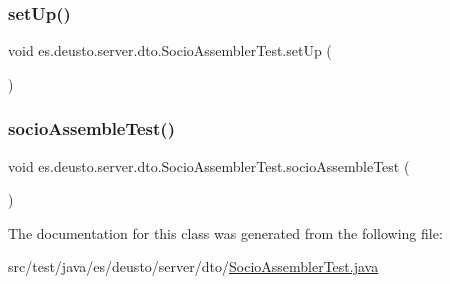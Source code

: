 \subsubsection{\texorpdfstring{setUp()}{setUp()}}
{\footnotesize\ttfamily void es.\+deusto.\+server.\+dto.\+Socio\+Assembler\+Test.\+set\+Up (\begin{DoxyParamCaption}{ }\end{DoxyParamCaption})}

\mbox{\label{classes_1_1deusto_1_1server_1_1dto_1_1_socio_assembler_test_a924609207b24e0c6ca0e681d1d052257}} 
\subsubsection{\texorpdfstring{socioAssembleTest()}{socioAssembleTest()}}
{\footnotesize\ttfamily void es.\+deusto.\+server.\+dto.\+Socio\+Assembler\+Test.\+socio\+Assemble\+Test (\begin{DoxyParamCaption}{ }\end{DoxyParamCaption})}



The documentation for this class was generated from the following file\+:\begin{DoxyCompactItemize}
\item 
src/test/java/es/deusto/server/dto/\mbox{\hyperlink{_socio_assembler_test_8java}{Socio\+Assembler\+Test.\+java}}\end{DoxyCompactItemize}
